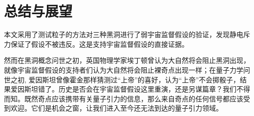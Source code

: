 \chapter{总结与展望}

本文采用了测试粒子的方法对三种黑洞进行了弱宇宙监督假设的验证，发现静电斥力保证了假设不被违反。这是支持宇宙监督假设的直接证据。

然而在黑洞概念问世之初，英国物理学家埃丁顿曾认为大自然将会阻止黑洞出现，就像宇宙监督假设的支持者们认为大自然将会阻止裸奇点出现一样；在量子力学问世之初, 爱因斯坦曾像霍金那样猜测过“上帝”的喜好，认为“上帝”不会掷骰子，结果爱因斯坦错了。历史是否会在宇宙监督假设这里重演，还是另谋篇章？我们不得而知。既然奇点应该携带有关量子引力的信息，那么来自奇点的任何信号都应该受到欢迎。它们是机会之窗，让我们进入至今还无法到达的量子引力领域\citep{ong2020space}。